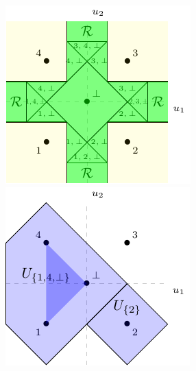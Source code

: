 \documentclass[12pt]{article}
\begin{document}
\begin{figure}
\begin{center}
\begin{minipage}{0.3\linewidth}
\includegraphics[width=\linewidth]{./tikz/abstain-link-linf.pdf}
\end{minipage}\hfill
\begin{minipage}{0.3\linewidth}
\includegraphics[width=\linewidth]{./tikz/abstain-link-U-regions-l1.pdf}

\end{minipage}
\end{center}
\end{figure}
\end{document}
